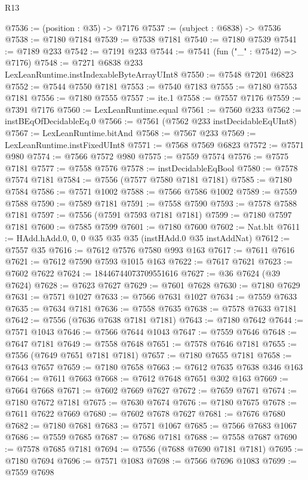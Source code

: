 \begin{lexlean}{R13}
\begin{coremodule}
@7536 := (position : @35) -> @7176
@7537 := (subject : @6838) -> @7536
@7538 := @7180 @7184
@7539 := @7538 @7181
@7540 := @7180 @7539
@7541 := @7189 @233
@7542 := @7191 @233
@7544 := @7541 (fun ("_" : @7542) => @7176)
@7548 := @7271 @6838 @233 LexLeanRuntime.instIndexableByteArrayUInt8
@7550 := @7548 @7201 @6823
@7552 := @7544 @7550 @7181
@7553 := @7540 @7183
@7555 := @7180 @7553 @7181
@7556 := @7180 @7555
@7557 := ite.{1}
@7558 := @7557 @7176
@7559 := @7391 @7176
@7560 := LexLeanRuntime.equal
@7561 := @7560 @233
@7562 := instBEqOfDecidableEq.{0}
@7566 := @7561 (@7562 @233 instDecidableEqUInt8)
@7567 := LexLeanRuntime.bitAnd
@7568 := @7567 @233
@7569 := LexLeanRuntime.instFixedUInt8
@7571 := @7568 @7569 @6823
@7572 := @7571 @980
@7574 := @7566 @7572 @980
@7575 := @7559 @7574
@7576 := @7575 @7181
@7577 := @7558 @7576
@7578 := instDecidableEqBool
@7580 := @7578 @7574 @7181
@7584 := @7556 (@7577 @7580 @7181 @7181)
@7585 := @7180 @7584
@7586 := @7571 @1002
@7588 := @7566 @7586 @1002
@7589 := @7559 @7588
@7590 := @7589 @7181
@7591 := @7558 @7590
@7593 := @7578 @7588 @7181
@7597 := @7556 (@7591 @7593 @7181 @7181)
@7599 := @7180 @7597 @7181
@7600 := @7585 @7599
@7601 := @7180 @7600
@7602 := Nat.blt
@7611 := HAdd.hAdd.{0, 0, 0} @35 @35 @35 (instHAdd.{0} @35 instAddNat)
@7612 := @7557 @35
@7616 := @7612 @7576 @7580 @993 @163
@7617 := @7611 @7616
@7621 := @7612 @7590 @7593 @1015 @163
@7622 := @7617 @7621
@7623 := @7602 @7622
@7624 := 18446744073709551616
@7627 := @36 @7624 (@39 @7624)
@7628 := @7623 @7627
@7629 := @7601 @7628
@7630 := @7180 @7629
@7631 := @7571 @1027
@7633 := @7566 @7631 @1027
@7634 := @7559 @7633
@7635 := @7634 @7181
@7636 := @7558 @7635
@7638 := @7578 @7633 @7181
@7642 := @7556 (@7636 @7638 @7181 @7181)
@7643 := @7180 @7642
@7644 := @7571 @1043
@7646 := @7566 @7644 @1043
@7647 := @7559 @7646
@7648 := @7647 @7181
@7649 := @7558 @7648
@7651 := @7578 @7646 @7181
@7655 := @7556 (@7649 @7651 @7181 @7181)
@7657 := @7180 @7655 @7181
@7658 := @7643 @7657
@7659 := @7180 @7658
@7663 := @7612 @7635 @7638 @346 @163
@7664 := @7611 @7663
@7668 := @7612 @7648 @7651 @302 @163
@7669 := @7664 @7668
@7671 := @7602 @7669 @7627
@7672 := @7659 @7671
@7674 := @7180 @7672 @7181
@7675 := @7630 @7674
@7676 := @7180 @7675
@7678 := @7611 @7622 @7669
@7680 := @7602 @7678 @7627
@7681 := @7676 @7680
@7682 := @7180 @7681
@7683 := @7571 @1067
@7685 := @7566 @7683 @1067
@7686 := @7559 @7685
@7687 := @7686 @7181
@7688 := @7558 @7687
@7690 := @7578 @7685 @7181
@7694 := @7556 (@7688 @7690 @7181 @7181)
@7695 := @7180 @7694
@7696 := @7571 @1083
@7698 := @7566 @7696 @1083
@7699 := @7559 @7698

\end{coremodule}
\end{lexlean}
